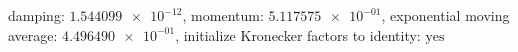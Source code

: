 damping: $\num[scientific-notation=true]{1.544099e-12}$, momentum: $\num[scientific-notation=true]{5.117575e-01}$, exponential moving average: $\num[scientific-notation=true]{4.496490e-01}$, initialize Kronecker factors to identity: $\text{yes}$